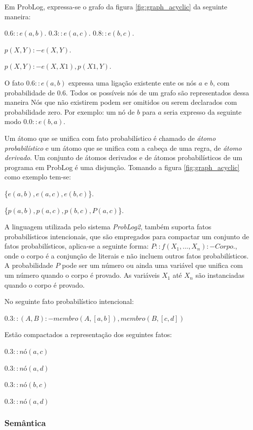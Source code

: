 \documentclass[
	12pt,				%
    oneside,			%
	a4paper,			%
	english,			%
	french,				%
	spanish,			%
	brazil,				%
	]{abntex2}
\begin{document}
Em ProbLog, expressa-se o grafo da figura \ref{fig:graph_acyclic} da seguinte maneira:

$0.6::e(a, b).  $ $0.3::e(a, c).  $ $0.8::e(b, c).$ \newline

$p(X, Y) :- e(X, Y). $ \newline

$p(X, Y) :- e(X, X1), p(X1, Y). $ \newline

O fato $0.6::e(a, b)$ expressa uma ligação existente ente os nós $a$ e $b$, com probabilidade de $0.6$. Todos os possíveis nós de um grafo são representados dessa maneira Nós que não existirem podem ser omitidos ou serem declarados com probabilidade zero. Por exemplo: um nó de $b$ para $a$ seria expresso da seguinte modo $0.0::e(b, a)$.

Um átomo que se unifica com fato probabilístico é chamado de \textit{átomo probabilístico} e um átomo que se unifica com a cabeça de uma regra, de \textit{átomo derivado}. Um conjunto de átomos derivados e de átomos probabilísticos de um programa em ProbLog é uma disjunção. Tomando a figura \ref{fig:graph_acyclic} como exemplo tem-se:

\{$e(a, b), e(a, c), e(b, c)$\}.\newline

\{$p(a, b), p(a, c), p(b, c), P(a, c)$\}.\newline

A linguagem utilizada pelo sistema \textit{ProbLog2}, também suporta fatos probabilísticos intencionais, que são empregados para compactar um conjunto de fatos probabilísticos, aplica-se a seguinte forma: $P :: f(X_1,...,X_n):- Corpo.$, onde o corpo é a conjunção de literais e não incluem outros fatos probabilísticos. A probabilidade $P$ pode ser um número ou ainda uma variável que unifica com um número quando o corpo é provado. As variáveis $X_1$ até $X_n$ são instanciadas quando o corpo é provado.

No seguinte fato probabilístico intencional:

$0.3::(A, B) :- membro(A, [a, b]), membro(B, [c,d])$

Estão compactados a representação dos seguintes fatos:

$0.3::nó(a, c)$

$0.3::nó(a, d)$

$0.3::nó(b, c)$

$0.3::nó(a, d)$


\subsubsection{Semântica}
\end{document}
